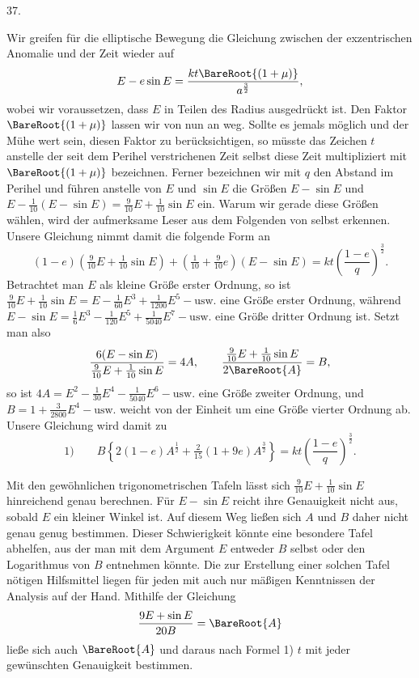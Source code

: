 \par{}
\begin{center}
37.
\end{center}
Wir greifen für die elliptische Bewegung die Gleichung zwischen der exzentrischen Anomalie und der Zeit wieder auf
\[
E-e\sin E=\frac{kt\BareRoot{(1+\mu)}}{a^{\frac{3}{2}}},
\]
wobei wir voraussetzen, dass $E$ in Teilen des Radius ausgedrückt ist. Den Faktor $\BareRoot{(1+\mu)}$ lassen wir von nun an weg. Sollte es jemals möglich und der Mühe wert sein, diesen Faktor zu berücksichtigen, so müsste das Zeichen $t$ anstelle der seit dem Perihel verstrichenen Zeit selbst diese Zeit multipliziert mit $\BareRoot{(1+\mu)}$ bezeichnen. Ferner bezeichnen wir mit $q$ den Abstand im Perihel und führen anstelle von $E$ und $\sin E$ die Größen $E-\sin E$ und $E-\tfrac{1}{10}(E-\sin E)=\tfrac{9}{10}E+\tfrac{1}{10}\sin E$ ein. Warum wir gerade diese Größen wählen, wird der aufmerksame Leser aus dem Folgenden von selbst erkennen. Unsere Gleichung nimmt damit die folgende Form an
\[
(1-e)(\tfrac{9}{10}E+\tfrac{1}{10}\sin E)+(\tfrac{1}{10}+\tfrac{9}{10}e)(E-\sin E)=kt\left(\frac{1-e}{q}\right)^{\frac{3}{2}}.
\]
Betrachtet man $E$ als kleine Größe erster Ordnung, so ist $\tfrac{9}{10}E+\tfrac{1}{10}\sin E=E-\tfrac{1}{60}E^3+\tfrac{1}{1200}E^5-\text{usw.}$ eine Größe erster Ordnung, während $E-\sin E=\tfrac{1}{6} E^3-\tfrac{1}{120}E^5+\tfrac{1}{5040}E^7-\text{usw.}$ eine Größe dritter Ordnung ist. Setzt man also
\[
\frac{6(E-\sin E)}{\frac{9}{10}E+\frac{1}{10}\sin E}=4A,\qquad
\frac{\frac{9}{10}E+\frac{1}{10}\sin E}{2\BareRoot{A}}=B,
\]
so ist $4A=E^2-\tfrac{1}{30}E^4-\tfrac{1}{5040}E^6-\text{usw.}$ eine Größe zweiter Ordnung, und $B=1+\tfrac{3}{2800}E^4-\text{usw.}$ weicht von der Einheit um eine Größe vierter Ordnung ab. Unsere Gleichung wird damit zu
\[
\text{1)}\qquad B\left\{2(1-e)A^{\frac{1}{2}}+\tfrac{2}{15}(1+9e)A^{\frac{3}{2}}\right\}=kt\left(\frac{1-e}{q}\right)^{\frac{3}{2}}.
\]

Mit den gewöhnlichen trigonometrischen Tafeln lässt sich $\tfrac{9}{10}E+\tfrac{1}{10}\sin E$ hinreichend genau berechnen. Für $E-\sin E$ reicht ihre Genauigkeit nicht aus, sobald $E$ ein kleiner Winkel ist. Auf diesem Weg ließen sich $A$ und $B$ daher nicht genau genug bestimmen. Dieser Schwierigkeit könnte eine besondere Tafel abhelfen, aus der man mit dem Argument $E$ entweder $B$ selbst oder den Logarithmus von $B$ entnehmen könnte. Die zur Erstellung einer solchen Tafel nötigen Hilfsmittel liegen für jeden mit auch nur mäßigen Kenntnissen der Analysis auf der Hand. Mithilfe der Gleichung
\[
\frac{9E+\sin E}{20B}=\BareRoot{A}
\]
ließe sich auch $\BareRoot{A}$ und daraus nach Formel 1) $t$ mit jeder gewünschten Genauigkeit bestimmen.

